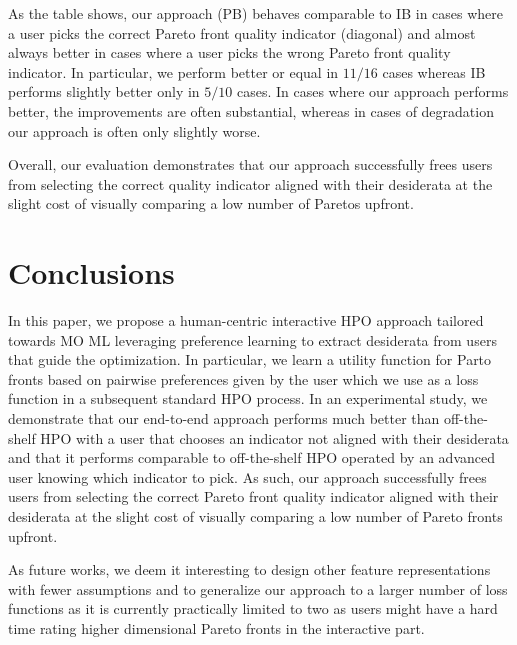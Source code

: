 As the table shows, our approach (PB) behaves comparable to IB in cases where a user picks the correct Pareto front quality indicator (diagonal) and almost always better in cases where a user picks the wrong Pareto front quality indicator. In particular, we perform better or equal in $11/16$ cases whereas IB performs slightly better only in $5/10$ cases. In cases where our approach performs better, the improvements are often substantial, whereas in cases of degradation our approach is often only slightly worse.

Overall, our evaluation demonstrates that our approach successfully frees users from selecting the correct quality indicator aligned with their desiderata at the slight cost of visually comparing a low number of Paretos upfront.

\section{Conclusions}
\label{moo-sec:conclusion}
In this paper, we propose a human-centric interactive HPO approach tailored towards MO ML leveraging preference learning to extract desiderata from users that guide the optimization. In particular, we learn a utility function for Parto fronts based on pairwise preferences given by the user which we use as a loss function in a subsequent standard HPO process. In an experimental study, we demonstrate that our end-to-end approach performs much better than off-the-shelf HPO with a user that chooses an indicator not aligned with their desiderata and that it performs comparable to off-the-shelf HPO operated by an advanced user knowing which indicator to pick. As such, our approach successfully frees users from selecting the correct Pareto front quality indicator aligned with their desiderata at the slight cost of visually comparing a low number of Pareto fronts upfront.

As future works, we deem it interesting to design other feature representations with fewer assumptions and to generalize our approach to a larger number of loss functions as it is currently practically limited to two as users might have a hard time rating higher dimensional Pareto fronts in the interactive part.
